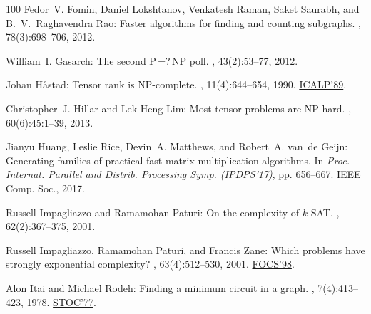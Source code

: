 \begin{thebibliography}{100}
{\sc Fedor~V. Fomin, Daniel Lokshtanov, Venkatesh Raman, Saket Saurabh, and
  B.~V.~Raghavendra Rao}: Faster algorithms for finding and counting subgraphs.
, 78(3):698--706, 2012.

{\sc William~I. Gasarch}: The second {P\,=?\,NP} poll.
, 43(2):53--77, 2012.
\newblock [\epfmtdoi{10.1145/2261417.2261434}]

{\sc Johan H{\aa}stad}: Tensor rank is {NP}-complete.
, 11(4):644--654, 1990.
\newblock \prelim \href{https://doi.org/10.1007/BFb0035776}{ICALP'89}.
\newblock [\epfmtdoi{10.1016/0196-6774(90)90014-6}]

{\sc Christopher~J. Hillar and Lek{-}Heng Lim}: Most tensor problems are
  {NP}-hard.
, 60(6):45:1--39, 2013.

{\sc Jianyu Huang, Leslie Rice, Devin~A. Matthews, and Robert~A. van~de Geijn}:
  Generating families of practical fast matrix multiplication algorithms.
\newblock In {\em Proc. Internat. Parallel and Distrib. Processing Symp.
  (IPDPS'17)}, pp. 656--667. IEEE Comp. Soc., 2017.

{\sc Russell Impagliazzo and Ramamohan Paturi}: On the complexity of $k$-{SAT}.
, 62(2):367--375, 2001.

{\sc Russell Impagliazzo, Ramamohan Paturi, and Francis Zane}: Which problems
  have strongly exponential complexity?
, 63(4):512--530, 2001.
\newblock \prelim \href{https://doi.org/10.1109/SFCS.1998.743516}{FOCS'98}.

{\sc Alon Itai and Michael Rodeh}: Finding a minimum circuit in a graph.
, 7(4):413--423, 1978.
\newblock \prelim \href{https://doi.org/10.1145/800105.803390}{STOC'77}.
\newblock [\epfmtdoi{10.1137/0207033}]


\end{thebibliography}
